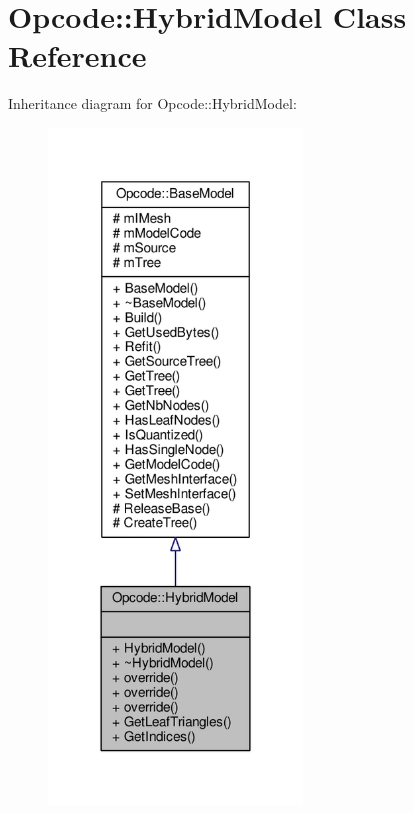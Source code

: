 \hypertarget{classOpcode_1_1HybridModel}{}\section{Opcode\+:\+:Hybrid\+Model Class Reference}
\label{classOpcode_1_1HybridModel}


Inheritance diagram for Opcode\+:\+:Hybrid\+Model\+:
\nopagebreak
\begin{figure}[H]
\begin{center}
\leavevmode
\includegraphics[width=191pt]{de/dcf/classOpcode_1_1HybridModel__inherit__graph}
\end{center}
\end{figure}


